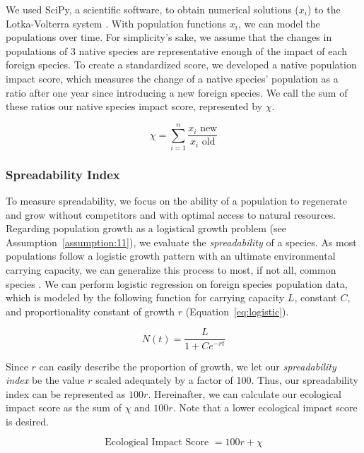 We used SciPy, a scientific software, to obtain numerical solutions (\(x_i\)) to the Lotka-Volterra system \cite{scipy}. With population functions \(x_i\), we can model the populations over time. For simplicity's sake, we assume that the changes in populations of 3 native species are representative enough of the impact of each foreign species. To create a standardized score, we developed a native population impact score, which measures the change of a native species' population as a ratio after one year since introducing a new foreign species. We call the sum of these ratios our native species impact score, represented by \(\chi\).

\begin{equation}
    \chi = \sum_{i = 1}^n \frac{x_i {\text{ new}}}{x_i {\text{ old}}}
    \label{eq:nativeproportion}
\end{equation}

\subsubsection{Spreadability Index}

To measure spreadability, we focus on the ability of a population to regenerate and grow without competitors and with optimal access to natural resources. Regarding population growth as a logistical growth problem (see Assumption~\ref{assumption:11}), we evaluate the \textit{spreadability} of a species. As most populations follow a logistic growth pattern with an ultimate environmental carrying capacity, we can generalize this process to most, if not all, common species \cite{noauthor_53_nodate}. We can perform logistic regression on foreign species population data, which is modeled by the following function for carrying capacity \(L\), constant \(C\), and proportionality constant of growth \(r\) 
(Equation~\ref{eq:logistic}). 

\begin{equation}
    N(t) = \frac{L}{1+Ce^{-rt}}
    \label{eq:logistic}
\end{equation}

Since \(r\) can easily describe the proportion of growth, we let our \textit{spreadability index} be the value \(r\) scaled adequately by a factor of 100. Thus, our spreadability index can be represented as \(100r\). Hereinafter, we can calculate our ecological impact score as the sum of \(\chi\) and \(100r\). Note that a lower ecological impact score is desired.

\begin{equation}
    \text{Ecological Impact Score } = 100r + \chi
    \label{eq:ecologicalimpact}
\end{equation}

